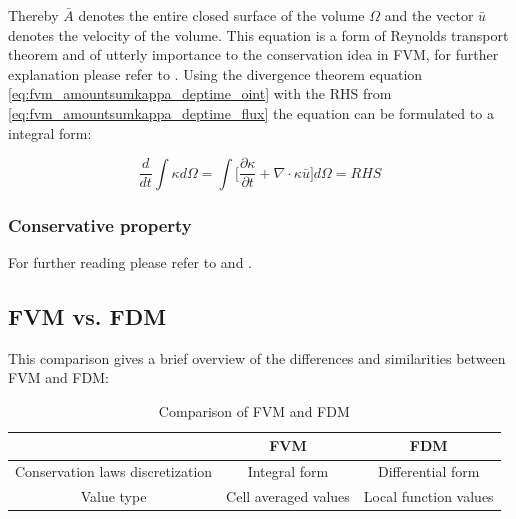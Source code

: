 Thereby $\bar{A}$ denotes the entire closed surface of the volume $\Omega$ and the vector
$\bar{u}$ denotes the velocity of the volume. This equation is a form of Reynolds 
transport theorem and of utterly importance to the conservation idea in FVM, for further explanation please refer to \citep[pg. 10]{Wesseling2009}.
Using the divergence theorem equation \ref{eq:fvm_amountsumkappa_deptime_oint} with the RHS from \ref{eq:fvm_amountsumkappa_deptime_flux} 
the equation can be formulated to a integral form:

\begin{equation}\label{eq:fvm_cons_form_conservat}
\frac {d}{dt} \int \kappa d \Omega = 
\int \biggl [\frac{\partial \kappa}{\partial t} + \nabla \cdot \kappa \bar{u} \biggr] d \Omega = RHS
\end{equation}


\subsubsection{Conservative property}



For further reading please refer to \citep{Versteeg2007} and \citep{Leveque2002}.

\subsection{FVM vs. FDM}

This comparison gives a brief overview of the differences and similarities between
FVM and FDM:
\begin{table}[htp]
\centering
\begin{tabular}{c|c|c}\label{fig:FVM_vs_FDM_simi}
 & FVM & FDM \\
\hline
Conservation laws discretization & Integral form & Differential form \\
\hline
Value type & Cell averaged values & Local function values \\
\end{tabular}
\caption{Comparison of FVM and FDM}
\end{table}





